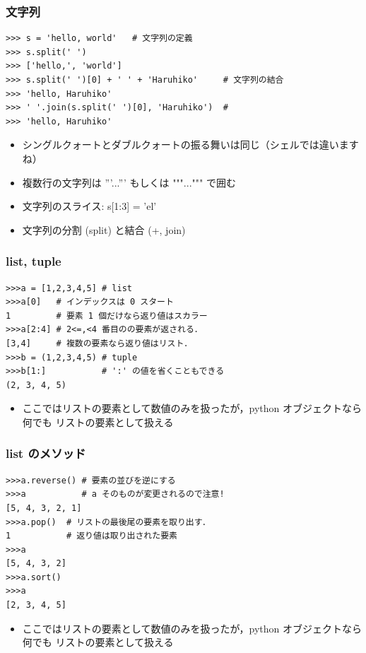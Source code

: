 \begin{frame}[t,fragile]
\frametitle{文字列}

\begin{lstlisting}
>>> s = 'hello, world'   # 文字列の定義
>>> s.split(' ')
>>> ['hello,', 'world']  
>>> s.split(' ')[0] + ' ' + 'Haruhiko'     # 文字列の結合
>>> 'hello, Haruhiko'
>>> ' '.join(s.split(' ')[0], 'Haruhiko')  #
>>> 'hello, Haruhiko'
\end{lstlisting}

\begin{itemize}
  \item シングルクォートとダブルクォートの振る舞いは同じ（シェルでは違いますね）
  \item 複数行の文字列は '''...''' もしくは """...""" で囲む
  \item 文字列のスライス: s[1:3] = 'el'
  \item 文字列の分割 (split) と結合 (+, join)
\end{itemize}
\end{frame}

\begin{frame}[t,fragile]
\frametitle{list, tuple}
\begin{lstlisting}
>>>a = [1,2,3,4,5] # list
>>>a[0]   # インデックスは 0 スタート
1         # 要素 1 個だけなら返り値はスカラー
>>>a[2:4] # 2<=,<4 番目のの要素が返される．
[3,4]     # 複数の要素なら返り値はリスト．
>>>b = (1,2,3,4,5) # tuple
>>>b[1:]           # ':' の値を省くこともできる
(2, 3, 4, 5)
\end{lstlisting}
\begin{itemize}
\item ここではリストの要素として数値のみを扱ったが，python オブジェクトなら何でも リストの要素として扱える
\end{itemize}
\end{frame}

\begin{frame}[t,fragile]
\frametitle{list のメソッド}
\begin{lstlisting}
>>>a.reverse() # 要素の並びを逆にする
>>>a           # a そのものが変更されるので注意!
[5, 4, 3, 2, 1]
>>>a.pop()  # リストの最後尾の要素を取り出す．
1           # 返り値は取り出された要素
>>>a
[5, 4, 3, 2]
>>>a.sort()
>>>a
[2, 3, 4, 5]
\end{lstlisting}
\begin{itemize}
\item ここではリストの要素として数値のみを扱ったが，python オブジェクトなら何でも リストの要素として扱える
\end{itemize}
\end{frame}




